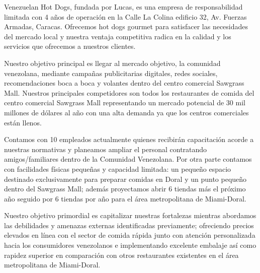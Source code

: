 Venezuelan Hot Dogs, fundada por Lucas, es una empresa de responsabilidad limitada con 4 años de operación en la Calle La Colina edificio 32, Av. Fuerzas Armadas, Caracas. Ofrecemos hot dogs gourmet para satisfacer las necesidades del mercado local y nuestra ventaja competitiva radica en la calidad y los servicios que ofrecemos a nuestros clientes. 

Nuestro objetivo principal es llegar al mercado objetivo, la comunidad venezolana, mediante campañas publicitarias digitales, redes sociales, recomendaciones boca a boca y volantes dentro del centro comercial Sawgrass Mall. Nuestros principales competidores son todos los restaurantes de comida del centro comercial Sawgrass Mall representando un mercado potencial de 30 mil millones de dólares al año con una alta demanda ya que los centros comerciales están llenos.

Contamos con 10 empleados actualmente quienes recibirán capacitación acorde a nuestras normativas y planeamos ampliar el personal contratando amigos/familiares dentro de la Comunidad Venezolana. Por otra parte contamos con facilidades físicas pequeñas y capacidad limitada: un pequeño espacio destinado exclusivamente para preparar comidas en Doral y un punto pequeño dentro del Sawgrass Mall; además proyectamos abrir 6 tiendas más el próximo año seguido por 6 tiendas por año para el área metropolitana de Miami-Doral.

Nuestro objetivo primordial es capitalizar nuestras fortalezas mientras abordamos las debilidades y amenazas externas identificadas previamente; ofreciendo precios elevados en línea con el sector de comida rápida junto con atención personalizada hacia los consumidores venezolanos e implementando excelente embalaje así como rapidez superior en comparación con otros restaurantes existentes en el área metropolitana de Miami-Doral.
